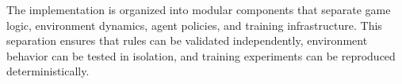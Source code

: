 \documentclass[10pt]{article}
\begin{document}
The implementation is organized into modular components that separate game logic, environment dynamics, agent policies, and training infrastructure. This separation ensures that rules can be validated independently, environment behavior can be tested in isolation, and training experiments can be reproduced deterministically.







\end{document}
